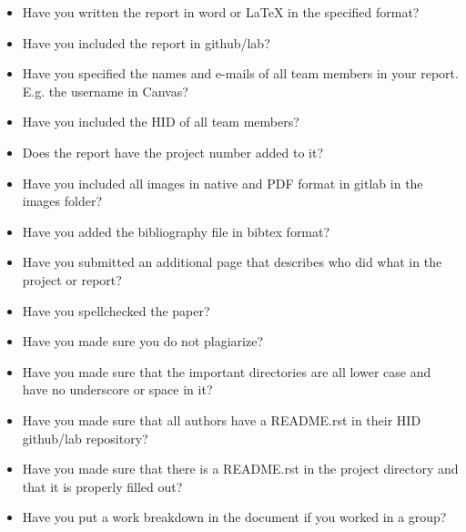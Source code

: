 \documentclass[9pt,twocolumn,twoside]{styles/osajnl}
\begin{document}
\begin{itemize}
\renewcommand{\labelitemi}{\scriptsize$\square$} 
\item Have you written the report in word or LaTeX in the specified
  format?
\item Have you included the report in github/lab?
\item Have you specified the names and e-mails of all team members in
  your report. E.g. the username in Canvas?
\item Have you included the HID of all team members?
\item Does the report have the project number added to it?
\item Have you included all images in native and PDF format in gitlab
  in the images folder?
\item Have you added the bibliography file in bibtex format?
\item Have you submitted an additional page that describes who did
  what in the project or report?
\item Have you spellchecked the paper?
\item Have you made sure you do not plagiarize?
\item Have you made sure that the important directories are all lower
  case and have no underscore or space in it?
\item Have you made sure that all authors have a README.rst in their
  HID github/lab repository?
\item Have you made sure that there is a README.rst in the project
  directory and that it is properly filled out?
\item Have you put a work breakdown in the document if you worked in a
  group?
\end{itemize}
\end{document}
